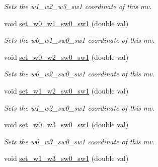 \begin{DoxyCompactItemize}
\begin{DoxyCompactList}\small\item\em Sets the w1\-\_\-w2\-\_\-w3\-\_\-sw1 coordinate of this mv. \end{DoxyCompactList}\item 
\hypertarget{classe3ga_1_1mv_aad4a625235db5c803fe508f4281f58bc}{void \hyperlink{classe3ga_1_1mv_aad4a625235db5c803fe508f4281f58bc}{set\-\_\-w0\-\_\-w1\-\_\-sw0\-\_\-sw1} (double val)}\label{classe3ga_1_1mv_aad4a625235db5c803fe508f4281f58bc}

\begin{DoxyCompactList}\small\item\em Sets the w0\-\_\-w1\-\_\-sw0\-\_\-sw1 coordinate of this mv. \end{DoxyCompactList}\item 
\hypertarget{classe3ga_1_1mv_a650eb9489973f281f3e7b73eabe602c5}{void \hyperlink{classe3ga_1_1mv_a650eb9489973f281f3e7b73eabe602c5}{set\-\_\-w0\-\_\-w2\-\_\-sw0\-\_\-sw1} (double val)}\label{classe3ga_1_1mv_a650eb9489973f281f3e7b73eabe602c5}

\begin{DoxyCompactList}\small\item\em Sets the w0\-\_\-w2\-\_\-sw0\-\_\-sw1 coordinate of this mv. \end{DoxyCompactList}\item 
\hypertarget{classe3ga_1_1mv_a289dd8f11d8854ab3744fbc3c24dcb62}{void \hyperlink{classe3ga_1_1mv_a289dd8f11d8854ab3744fbc3c24dcb62}{set\-\_\-w1\-\_\-w2\-\_\-sw0\-\_\-sw1} (double val)}\label{classe3ga_1_1mv_a289dd8f11d8854ab3744fbc3c24dcb62}

\begin{DoxyCompactList}\small\item\em Sets the w1\-\_\-w2\-\_\-sw0\-\_\-sw1 coordinate of this mv. \end{DoxyCompactList}\item 
\hypertarget{classe3ga_1_1mv_a0e57e2bf0a7164a17226b18d35f7d3bf}{void \hyperlink{classe3ga_1_1mv_a0e57e2bf0a7164a17226b18d35f7d3bf}{set\-\_\-w0\-\_\-w3\-\_\-sw0\-\_\-sw1} (double val)}\label{classe3ga_1_1mv_a0e57e2bf0a7164a17226b18d35f7d3bf}

\begin{DoxyCompactList}\small\item\em Sets the w0\-\_\-w3\-\_\-sw0\-\_\-sw1 coordinate of this mv. \end{DoxyCompactList}\item 
\hypertarget{classe3ga_1_1mv_aab47537b4a94cf7774434d3d041b8647}{void \hyperlink{classe3ga_1_1mv_aab47537b4a94cf7774434d3d041b8647}{set\-\_\-w1\-\_\-w3\-\_\-sw0\-\_\-sw1} (double val)}\label{classe3ga_1_1mv_aab47537b4a94cf7774434d3d041b8647}


\end{DoxyCompactItemize}
